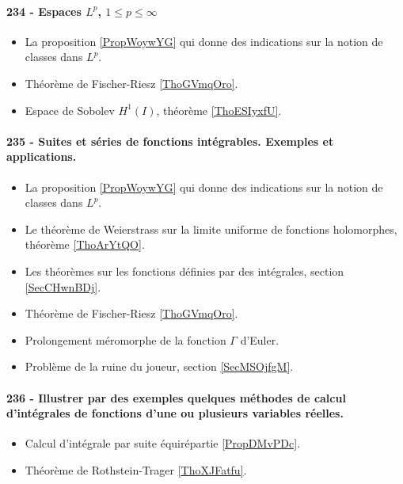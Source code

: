 \paragraph{234 - Espaces \( L^p\), \( 1\leq p\leq\infty\)}
\begin{itemize}
    \item La proposition \ref{PropWoywYG} qui donne des indications sur la notion de classes dans \( L^p\).
    \item Théorème de Fischer-Riesz \ref{ThoGVmqOro}.
    \item Espace de Sobolev \( H^1(I)\), théorème \ref{ThoESIyxfU}.
\end{itemize}
\paragraph{235 - Suites et séries de fonctions intégrables. Exemples et applications.}
\begin{itemize}
    \item La proposition \ref{PropWoywYG} qui donne des indications sur la notion de classes dans \( L^p\).
    \item Le théorème de Weierstrass sur la limite uniforme de fonctions holomorphes, théorème \ref{ThoArYtQO}.
    \item Les théorèmes sur les fonctions définies par des intégrales, section \ref{SecCHwnBDj}.
    \item Théorème de Fischer-Riesz \ref{ThoGVmqOro}.
    \item Prolongement méromorphe de la fonction \( \Gamma\) d'Euler.
    \item Problème de la ruine du joueur, section \ref{SecMSOjfgM}.
\end{itemize}
\paragraph{236 - Illustrer par des exemples quelques méthodes de calcul d’intégrales de fonctions d’une ou plusieurs variables réelles.}
\begin{itemize}
    \item Calcul d'intégrale par suite équirépartie \ref{PropDMvPDc}.
    \item Théorème de Rothstein-Trager \ref{ThoXJFatfu}.
\end{itemize}
